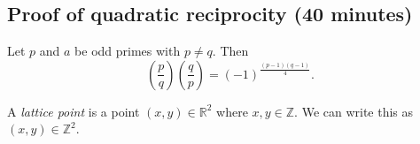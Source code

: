 \documentclass[letterpaper, 11 pt]{article}
\begin{document}
\subsection{Proof of quadratic reciprocity (40 minutes)}

\begin{thm}
 Let $p$ and $a$ be odd primes with $p\neq q$. Then \[\left(\frac{p}{q}\right)\left(\frac{q}{p}\right)=(-1)^{\frac{(p-1)(q-1)}{4}}.\]
\end{thm}

\begin{defn}
 A \emph{lattice point} is a point $(x,y)\in\mathbb{R}^2$ where $x,y\in\mathbb{Z}$. We can write this as $(x,y)\in\mathbb{Z}^2$.
\end{defn}
\end{document}
